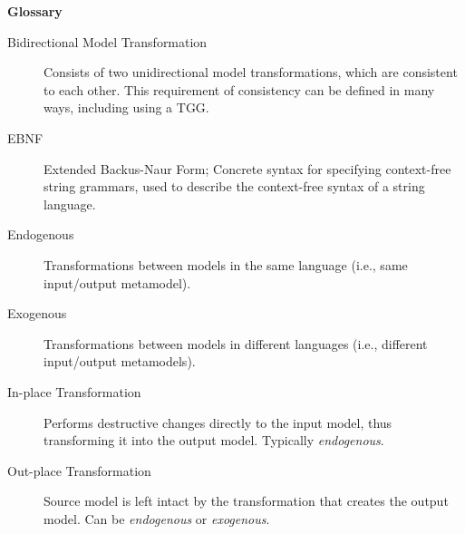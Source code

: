 \newpage
{}
{}
\hypertarget{glossary}{}

\vspace{1cm}
{\Huge \bf Glossary}
\vspace{1cm}

\begin{description}

\item[Bidirectional Model Transformation]  Consists of two unidirectional model transformations, which are consistent to each other. This requirement of
consistency can be defined in many ways, including using a TGG.

\item[EBNF] Extended Backus-Naur Form; Concrete syntax for specifying context-free string grammars, used to describe the context-free syntax of a
string language.

\item[Endogenous] Transformations between models in the same language (i.e., same input/output metamodel). 
 
\item[Exogenous] Transformations between models in different languages (i.e., different input/output metamodels). 

\item[In-place Transformation] Performs destructive changes directly to the input model, thus transforming it into the output model. Typically
\emph{endogenous}.

\item[Out-place Transformation] Source model is left intact by the transformation that creates the output model. Can be \emph{endogenous} or \emph{exogenous}.

\end{description}
